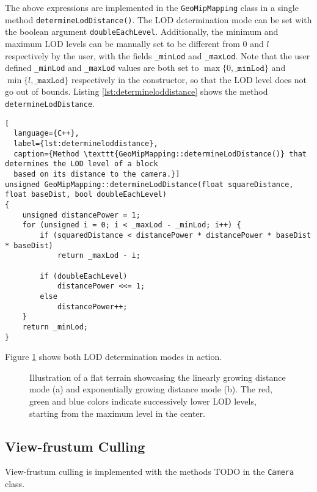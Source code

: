 The above expressions are implemented in the \texttt{GeoMipMapping} class in a single method \texttt{determineLodDistance()}.
The LOD determination mode can be set with the boolean argument \texttt{doubleEachLevel}.
Additionally, the minimum and maximum LOD levels can be manually set to be different from 0 and $l$ respectively 
by the user, with the fields \texttt{\_minLod} and \texttt{\_maxLod}. 
Note that the user defined \texttt{\_minLod} and \texttt{\_maxLod} values
are both set to $\max\{0,\texttt{\_minLod}\}$ and $\min\{l,\texttt{\_maxLod}\}$ respectively in the constructor, 
so that the LOD level does not go out of bounds.
Listing \ref{lst:determineloddistance} shows the method \texttt{determineLodDistance}.

\begin{lstlisting}[
  language={C++},
  label={lst:determineloddistance},
  caption={Method \texttt{GeoMipMapping::determineLodDistance()} that determines the LOD level of a block 
  based on its distance to the camera.}]
unsigned GeoMipMapping::determineLodDistance(float squareDistance, float baseDist, bool doubleEachLevel)
{
    unsigned distancePower = 1;
    for (unsigned i = 0; i < _maxLod - _minLod; i++) {
        if (squaredDistance < distancePower * distancePower * baseDist * baseDist)
            return _maxLod - i;

        if (doubleEachLevel)
            distancePower <<= 1;
        else
            distancePower++;
    }
    return _minLod;
}
\end{lstlisting}

Figure \ref{fig:atlod-lin-exp} shows both LOD determination modes in action.
\begin{figure}[H]
  \centering
  \qquad
  \caption{Illustration of a flat terrain showcasing the linearly growing distance mode (a) and exponentially growing distance mode (b). The red, green and blue colors indicate successively lower LOD levels, starting from the maximum level in the center.}\label{fig:atlod-lin-exp}
\end{figure}

\subsection{View-frustum Culling}
View-frustum culling is implemented with the methods TODO in the \texttt{Camera} class.


